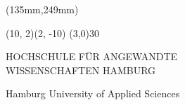 \begin{titlepage}
\begin{textblock*}{\textwidth}(135mm,249mm)
	\begin{minipage}[b][0cm][t]{\textwidth}
		\fontsize{9pt}{9pt}\selectfont
		\begin{picture}(10, 2)(2, -10)
			\linethickness{0.9mm}
			\line(3,0){30}
		\end{picture}
		\vspace{-5mm}
		\begin{flushleft}
			HOCHSCHULE FÜR ANGEWANDTE\\WISSENSCHAFTEN HAMBURG
		\end{flushleft}
		\vspace{-6mm}
		\begin{flushleft}
			Hamburg University of Applied Sciences
		\end{flushleft}
	\end{minipage}
\end{textblock*}

\hypersetup{pageanchor=true}
\end{titlepage}
\   %

